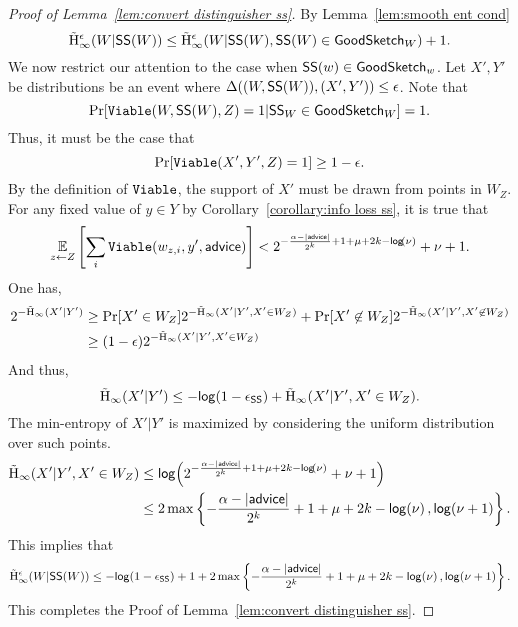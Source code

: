 \begin{proof}[Proof of Lemma~\ref{lem:convert distinguisher ss}]
\noindent
By Lemma~\ref{lem:smooth ent cond}
\[
\tilde{\mathrm{H}}_\infty^\epsilon(W| {\mathsf{SS}}(W)) \le \tilde{\mathrm{H}}_\infty^\epsilon(W| {\mathsf{SS}}(W), {\mathsf{SS}}(W)\in \mathsf{GoodSketch}_W) +1.
\]
We now restrict our attention to the case when ${\mathsf{SS}}(w) \in \mathsf{GoodSketch}_w$.   
Let $X', Y'$ be distributions  be an event where $\Delta((W, {\mathsf{SS}}(W)), (X', Y'))\le \epsilon$. Note that 
\[
\Pr[\mathtt{Viable}(W, {\mathsf{SS}}(W), Z) = 1| {\mathsf{SS}}_W \in \mathsf{GoodSketch}_W] = 1.
\]
Thus, it must be the case that 
\[
\Pr[\mathtt{Viable}(X', Y', Z) = 1] \ge 1-\epsilon.
\]
By the definition of $\mathtt{Viable}$, the support of $X'$ must be drawn from points in $W_Z$.  For any fixed value of $y\in Y$ by Corollary~\ref{corollary:info loss ss}, it is true that 
\begin{align*}
\operatorname*{\mathbb{E}}_{z\leftarrow Z} \left[\sum_{i }  \mathtt{Viable}(w_{z,i}, y', {\mathsf{advice}})  \right]< 2^{-\frac{\alpha-|{\mathsf{advice}}|}{2^k}+1+\mu+2k-\mathsf{log}\!\left(\nu\right)}+\nu+1.
\end{align*}
One has, 
\begin{align*}
2^{-\tilde{\mathrm{H}}_\infty(X'|Y')} &\ge  \Pr[X' \in W_Z] 2^{-\tilde{\mathrm{H}}_\infty(X'|Y', X'\in W_Z) }+ \Pr[X'\not\in W_Z] 2^{-\tilde{\mathrm{H}}_\infty(X'|Y', X'\not\in W_Z)}\\
 &\ge  (1-\epsilon)2^{-\tilde{\mathrm{H}}_\infty(X'|Y', X'\in W_Z) }
\end{align*}
And thus, 
\[
\tilde{\mathrm{H}}_\infty(X'|Y') \le  -\mathsf{log}\!\left(1-\epsilon_{\mathsf{SS}}\right) +\tilde{\mathrm{H}}_\infty(X'|Y', X'\in W_Z).
\]
The min-entropy of $X' |Y'$ is maximized by considering the uniform distribution over such points. \begin{align*}
\tilde{\mathrm{H}}_\infty(X'|Y' , X'\in W_Z) &\le \mathsf{log}\!\left(2^{-\frac{\alpha-|{\mathsf{advice}}|}{2^k}+1+\mu+2k-\mathsf{log}\!\left(\nu\right)}+\nu+1\right)\\
&\le 2\max\left\{-\frac{\alpha-|{\mathsf{advice}}|}{2^k}+1+\mu+2k-\mathsf{log}\!\left(\nu\right), \mathsf{log}\!\left(\nu+1\right)\right\}.
\end{align*}
This implies that 
\[
\tilde{\mathrm{H}}_\infty^\epsilon(W| {\mathsf{SS}}(W)) \le -\mathsf{log}\!\left(1-\epsilon_{\mathsf{SS}}\right) +1 + 2\max\left\{-\frac{\alpha-|{\mathsf{advice}}|}{2^k}+1+\mu+2k-\mathsf{log}\!\left(\nu\right), \mathsf{log}\!\left(\nu+1\right)\right\}.
\]
This completes the Proof of Lemma~\ref{lem:convert distinguisher ss}.
\end{proof}


